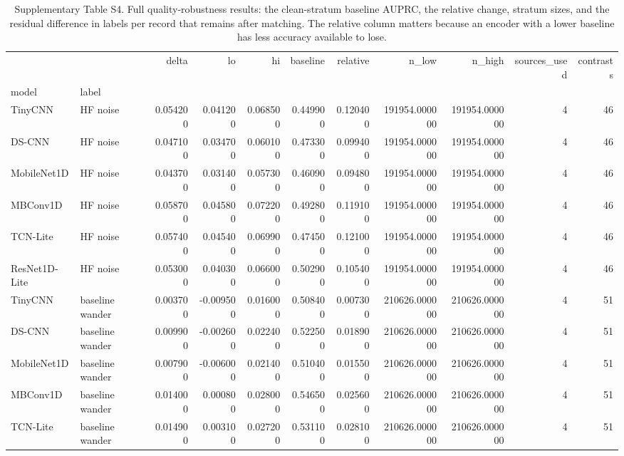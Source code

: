 \begin{table}
\caption{Supplementary Table S4. Full quality-robustness results: the clean-stratum baseline AUPRC, the relative change, stratum sizes, and the residual difference in labels per record that remains after matching. The relative column matters because an encoder with a lower baseline has less accuracy available to lose.}
\begin{tabular}{llrrrrrrrrr}
\toprule
 &  & delta & lo & hi & baseline & relative & n\_low & n\_high & sources\_used & contrasts \\
model & label &  &  &  &  &  &  &  &  &  \\
\midrule
TinyCNN & HF noise & 0.054200 & 0.041200 & 0.068500 & 0.449900 & 0.120400 & 191954.000000 & 191954.000000 & 4 & 46 \\
\cline{1-11}
DS-CNN & HF noise & 0.047100 & 0.034700 & 0.060100 & 0.473300 & 0.099400 & 191954.000000 & 191954.000000 & 4 & 46 \\
\cline{1-11}
MobileNet1D & HF noise & 0.043700 & 0.031400 & 0.057300 & 0.460900 & 0.094800 & 191954.000000 & 191954.000000 & 4 & 46 \\
\cline{1-11}
MBConv1D & HF noise & 0.058700 & 0.045800 & 0.072200 & 0.492800 & 0.119100 & 191954.000000 & 191954.000000 & 4 & 46 \\
\cline{1-11}
TCN-Lite & HF noise & 0.057400 & 0.045400 & 0.069900 & 0.474500 & 0.121000 & 191954.000000 & 191954.000000 & 4 & 46 \\
\cline{1-11}
ResNet1D-Lite & HF noise & 0.053000 & 0.040300 & 0.066000 & 0.502900 & 0.105400 & 191954.000000 & 191954.000000 & 4 & 46 \\
\cline{1-11}
TinyCNN & baseline wander & 0.003700 & -0.009500 & 0.016000 & 0.508400 & 0.007300 & 210626.000000 & 210626.000000 & 4 & 51 \\
\cline{1-11}
DS-CNN & baseline wander & 0.009900 & -0.002600 & 0.022400 & 0.522500 & 0.018900 & 210626.000000 & 210626.000000 & 4 & 51 \\
\cline{1-11}
MobileNet1D & baseline wander & 0.007900 & -0.006000 & 0.021400 & 0.510400 & 0.015500 & 210626.000000 & 210626.000000 & 4 & 51 \\
\cline{1-11}
MBConv1D & baseline wander & 0.014000 & 0.000800 & 0.028000 & 0.546500 & 0.025600 & 210626.000000 & 210626.000000 & 4 & 51 \\
\cline{1-11}
TCN-Lite & baseline wander & 0.014900 & 0.003100 & 0.027200 & 0.531100 & 0.028100 & 210626.000000 & 210626.000000 & 4 & 51 \\

\end{tabular}
\end{table}
